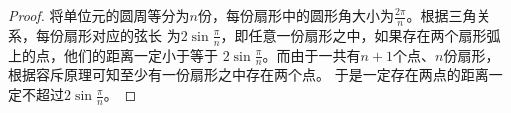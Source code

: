 \begin{proof}
    将单位元的圆周等分为$n$份，每份扇形中的圆形角大小为$\frac{2\pi}{n}$。根据三角关系，每份扇形对应的弦长
    为$2\sin\frac{\pi}{n}$，即任意一份扇形之中，如果存在两个扇形弧上的点，他们的距离一定小于等于
    $2\sin\frac{\pi}{n}$。而由于一共有$n+1$个点、$n$份扇形，根据容斥原理可知至少有一份扇形之中存在两个点。
    于是一定存在两点的距离一定不超过$2\sin\frac{\pi}{n}$。
\end{proof}